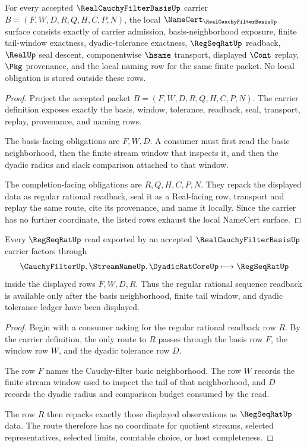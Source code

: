 \begin{theorem}
\label{thm:real-cauchy-filter-basis-namecert-obligations}
For every accepted $\RealCauchyFilterBasisUp$ carrier $B=(F,W,D,R,Q,H,C,P,N)$, the local $\NameCert_{\RealCauchyFilterBasisUp}$ surface consists exactly of carrier admission, basis-neighborhood exposure, finite tail-window exactness, dyadic-tolerance exactness, $\RegSeqRatUp$ readback, $\RealUp$ seal descent, componentwise $\hsame$ transport, displayed $\Cont$ replay, $\Pkg$ provenance, and the local naming row for the same finite packet. No local obligation is stored outside these rows.
\end{theorem}
\begin{proof}
Project the accepted packet $B=(F,W,D,R,Q,H,C,P,N)$. The carrier definition exposes exactly the basis, window, tolerance, readback, seal, transport, replay, provenance, and naming rows.

The basis-facing obligations are $F,W,D$. A consumer must first read the basic neighborhood, then the finite stream window that inspects it, and then the dyadic radius and slack comparison attached to that window.

The completion-facing obligations are $R,Q,H,C,P,N$. They repack the displayed data as regular rational readback, seal it as a Real-facing row, transport and replay the same route, cite its provenance, and name it locally. Since the carrier has no further coordinate, the listed rows exhaust the local NameCert surface.
\end{proof}

\begin{theorem}
\label{thm:real-cauchy-filter-basis-regseqrat-handoff}
Every $\RegSeqRatUp$ read exported by an accepted $\RealCauchyFilterBasisUp$ carrier factors through
$$
\CauchyFilterUp,\StreamNameUp,\DyadicRatCoreUp \longmapsto \RegSeqRatUp
$$
inside the displayed rows $F,W,D,R$. Thus the regular rational sequence readback is available only after the basis neighborhood, finite tail window, and dyadic tolerance ledger have been displayed.
\end{theorem}
\begin{proof}
Begin with a consumer asking for the regular rational readback row $R$. By the carrier definition, the only route to $R$ passes through the basis row $F$, the window row $W$, and the dyadic tolerance row $D$.

The row $F$ names the Cauchy-filter basic neighborhood. The row $W$ records the finite stream window used to inspect the tail of that neighborhood, and $D$ records the dyadic radius and comparison budget consumed by the read.

The row $R$ then repacks exactly those displayed observations as $\RegSeqRatUp$ data. The route therefore has no coordinate for quotient streams, selected representatives, selected limits, countable choice, or host completeness.
\end{proof}

